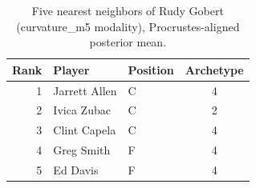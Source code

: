 \begin{table}[htbp]
  \centering\small
  \begin{tabular}{rllc}
    \toprule
    Rank & Player & Position & Archetype \\
    \midrule
    1 & Jarrett Allen & C & 4 \\
    2 & Ivica Zubac & C & 2 \\
    3 & Clint Capela & C & 4 \\
    4 & Greg Smith & F & 4 \\
    5 & Ed Davis & F & 4 \\
    \bottomrule
  \end{tabular}
  \caption{Five nearest neighbors of Rudy Gobert (curvature_m5 modality), Procrustes-aligned posterior mean.}
  \label{tab:Rudy_Gobert_neighbors_curvature_m5}
\end{table}

